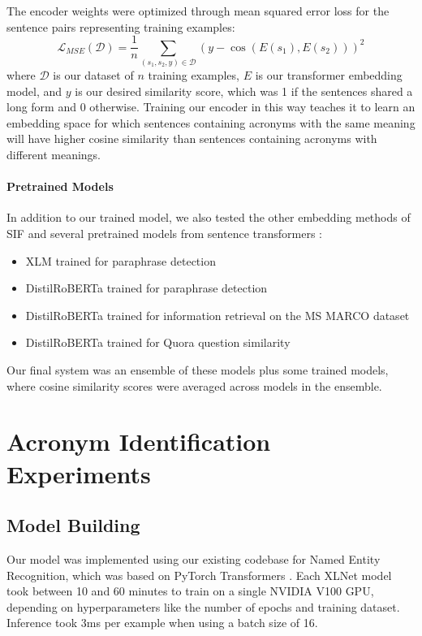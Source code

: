\documentclass[letterpaper]{article} %
\begin{document}
The encoder weights were optimized through mean squared error loss for the sentence pairs representing training examples:
\[
\mathcal{L}_{MSE}(\mathcal{D}) = \frac{1}{n} \sum_{(s_1, s_2, y) \in \mathcal{D}} (y - \cos(E(s_1), E(s_2)))^2
\]
where $\mathcal{D}$ is our dataset of $n$ training examples, $E$ is our transformer embedding model, and $y$ is our desired similarity score, which was 1 if the sentences shared a long form and 0 otherwise. Training our encoder in this way teaches it to learn an embedding space for which sentences containing acronyms with the same meaning will have higher cosine similarity than sentences containing acronyms with different meanings.

\paragraph*{Pretrained Models}
In addition to our trained model, we also tested the other embedding methods of SIF \cite{arora2017asimple} and several pretrained models from sentence transformers \cite{reimers-2019-sentence-bert}:

\begin{itemize}
\item XLM \cite{lample2019cross} trained for paraphrase detection
\item DistilRoBERTa \cite{sanh2020distilbert} trained for paraphrase detection
\item DistilRoBERTa trained for information retrieval on the MS MARCO dataset \cite{bajaj2016ms}
\item DistilRoBERTa trained for Quora question similarity
\end{itemize}

Our final system was an ensemble of these models plus some trained models, where cosine similarity scores were averaged across models in the ensemble.

\section{Acronym Identification Experiments}
\subsection{Model Building}
Our model was implemented using our existing codebase for Named Entity Recognition, which was based on PyTorch Transformers \cite{wolf-etal-2020-transformers}. Each XLNet model took between 10 and 60 minutes to train on a single NVIDIA V100 GPU, depending on hyperparameters like the number of epochs and training dataset. Inference took 3ms per example when using a batch size of 16.
\end{document}

